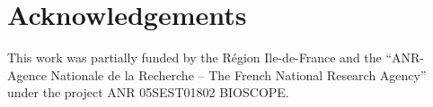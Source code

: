 

\section*{Acknowledgements}
This work was partially funded by the R\'egion Ile-de-France and the
“ANR-Agence Nationale de la Recherche – The French National Research
Agency” under the project ANR 05SEST01802 BIOSCOPE.



